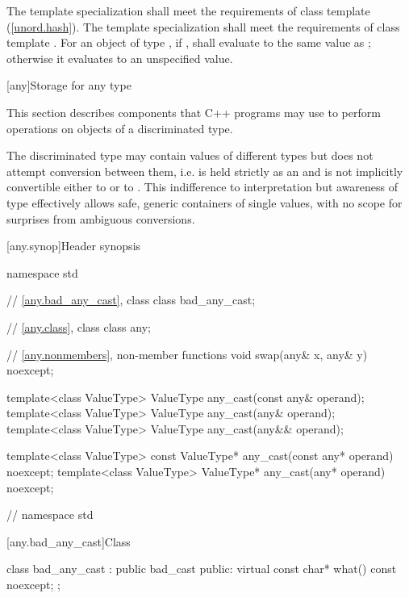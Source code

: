 \begin{itemdescr}
\pnum
\requires
The template specialization  shall meet the requirements of class template  (\ref{unord.hash}).
The template specialization  shall meet the requirements of class template .
For an object  of type , if ,
 shall evaluate to the same value as ;
otherwise it evaluates to an unspecified value.
\end{itemdescr}

[any]{Storage for any type}

\pnum
This section describes components that C++ programs may use to perform operations on objects of a discriminated type.

\pnum
\enternote
The discriminated type may contain values of different types but does not attempt conversion between them,
i.e.  is held strictly as an  and is not implicitly convertible either to  or to .
This indifference to interpretation but awareness of type effectively allows safe, generic containers of single values, with no scope for surprises from ambiguous conversions.
\exitnote

[any.synop]{Header  synopsis}

\begin{codeblock}
namespace std {
  // \ref{any.bad_any_cast}, class 
  class bad_any_cast;

  // \ref{any.class}, class 
  class any;

  // \ref{any.nonmembers}, non-member functions
  void swap(any& x, any& y) noexcept;
  
  template<class ValueType>
    ValueType any_cast(const any& operand);
  template<class ValueType>
    ValueType any_cast(any& operand);
  template<class ValueType>
    ValueType any_cast(any&& operand);
  
  template<class ValueType>
    const ValueType* any_cast(const any* operand) noexcept;
  template<class ValueType>
    ValueType* any_cast(any* operand) noexcept;
} // namespace std
\end{codeblock}

[any.bad_any_cast]{Class }

\begin{codeblock}
class bad_any_cast : public bad_cast {
public:
  virtual const char* what() const noexcept;
};
\end{codeblock}

